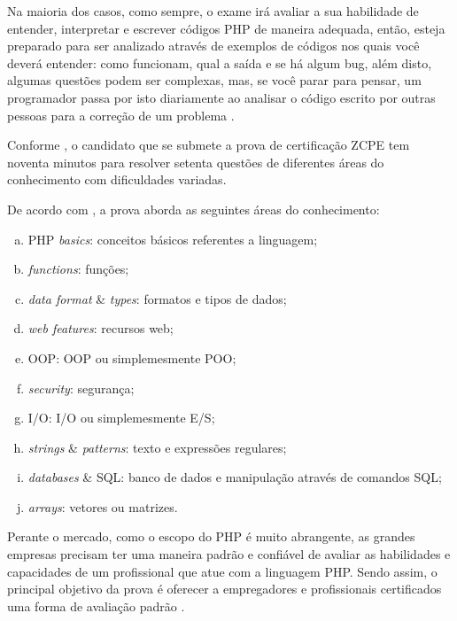 Na maioria dos casos, como sempre, o exame irá avaliar a sua habilidade de
entender, interpretar e escrever códigos \acs{PHP} de maneira adequada, então,
esteja preparado para ser analizado através de exemplos de códigos nos quais
você deverá entender: como funcionam, qual a saída e se há algum \acs{bug},
além disto, algumas questões podem ser complexas, mas, se você parar para
pensar, um programador passa por isto diariamente ao analisar o código escrito
por outras pessoas para a correção de um problema
\cite{theZendPHPCertificationPracticeTestBook}.

Conforme , o candidato que
se submete a prova de certificação \acs{ZCPE} tem noventa minutos para resolver 
setenta questões de diferentes áreas do conhecimento com dificuldades variadas.

De acordo com , a prova aborda as seguintes áreas do
conhecimento:

\begin{enumerate}[a)]
    \item \acs{PHP} \textit{basics}: 				conceitos básicos referentes a
    linguagem;
    \item \textit{functions}: 						funções;
    \item \textit{data format} \& \textit{types}: 	formatos e tipos de
    dados;
    \item \textit{web features}: 					recursos web;
    \item \acs{OOP}:								\acl{OOP} ou simplemesmente \ac{POO};
    \item \textit{security}: 						segurança;
    \item \acs{I/O}: 								\acl{I/O} ou simplemesmente \ac{E/S};
    \item \textit{strings} \& \textit{patterns}: 	texto e expressões
    regulares;
    \item \textit{databases} \& \acs{SQL}: 		banco de dados e
    manipulação através de comandos \ac{SQL};
    \item \textit{arrays}: 						vetores ou matrizes.
\end{enumerate}

Perante o mercado, como o escopo do PHP é muito abrangente, as grandes empresas
precisam ter uma maneira padrão e confiável de avaliar as habilidades e 
capacidades de um profissional que atue com a linguagem PHP. Sendo assim, o
principal objetivo da prova é oferecer a empregadores e profissionais 
certificados uma forma de avaliação padrão \cite{zendPhp5CertificationStudyGuide}.

